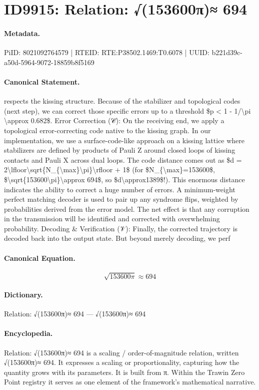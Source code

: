 \section*{ID9915: Relation: √(153600π)≈ 694}
\paragraph{Metadata.}
PiID: 8021092764579 | RTEID: RTE:P38502.1469:T0.6078 | UUID: b221d39c-a50d-5964-9072-18859b8f5169

\paragraph{Canonical Statement.}
respects the kissing structure. Because of the stabilizer and topological codes (next step), we can correct those specific errors up to a threshold \$p < 1 - 1/\textbackslash{}pi \textbackslash{}approx 0.682\$. Error Correction (𝒞): On the receiving end, we apply a topological error-correcting code native to the kissing graph. In our implementation, we use a surface-code-like approach on a kissing lattice where stabilizers are defined by products of Pauli Z around closed loops of kissing contacts and Pauli X across dual loops. The code distance comes out as \$d = 2\textbackslash{}lfloor\textbackslash{}sqrt\{N\_\{\textbackslash{}max\}\textbackslash{}pi\}\textbackslash{}rfloor + 1\$ (for \$N\_\{\textbackslash{}max\}=153600\$, \$\textbackslash{}sqrt\{153600\textbackslash{}pi\}\textbackslash{}approx 694\$, so \$d\textbackslash{}approx1389\$!). This enormous distance indicates the ability to correct a huge number of errors. A minimum-weight perfect matching decoder is used to pair up any syndrome flips, weighted by probabilities derived from the error model. The net effect is that any corruption in the transmission will be identified and corrected with overwhelming probability. Decoding \& Verification (𝒱): Finally, the corrected trajectory is decoded back into the output state. But beyond merely decoding, we perf

\paragraph{Canonical Equation.}
\[
\sqrt{153600\pi}\approx 694
\]

\paragraph{Dictionary.}
Relation: √(153600π)≈ 694 — √(153600π)≈ 694

\paragraph{Encyclopedia.}
Relation: √(153600π)≈ 694 is a scaling / order-of-magnitude relation, written √(153600π)≈ 694. It expresses a scaling or proportionality, capturing how the quantity grows with its parameters. It is built from π. Within the Trawin Zero Point registry it serves as one element of the framework's mathematical narrative.
